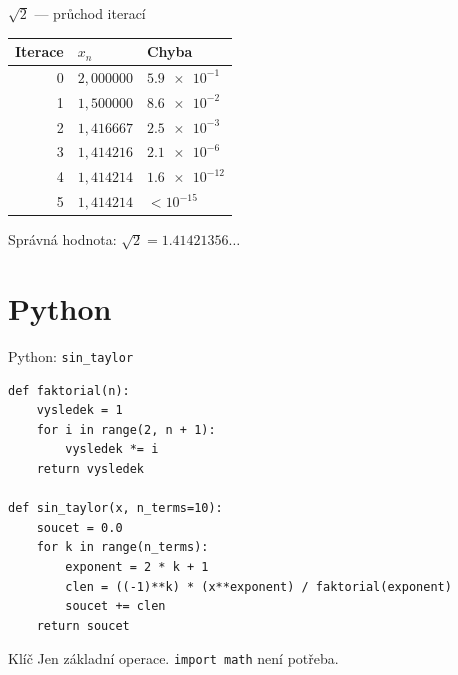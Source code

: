 \documentclass[12pt]{beamer}
\begin{document}
\begin{frame}{$\sqrt{2}$ --- průchod iterací}

    \begin{center}
    \begin{tabular}{@{}rll@{}}
    \toprule
    Iterace & $x_n$            & Chyba         \\ \midrule
    0       & $2{,}000000$     & $\num{5.9e-1}$ \\
    1       & $1{,}500000$     & $\num{8.6e-2}$ \\
    2       & $1{,}416667$     & $\num{2.5e-3}$ \\
    3       & $1{,}414216$     & $\num{2.1e-6}$ \\
    4       & $1{,}414214$     & $\num{1.6e-12}$ \\
    5       & $1{,}414214$     & $< 10^{-15}$ \\
    \bottomrule
    \end{tabular}
    \end{center}

    \medskip
    \centering
    \small Správná hodnota: $\sqrt{2} = \num{1.41421356}\ldots$

\end{frame}

\section{Python}

\begin{frame}[fragile]{Python: \texttt{sin\_taylor}}

\begin{lstlisting}
def faktorial(n):
    vysledek = 1
    for i in range(2, n + 1):
        vysledek *= i
    return vysledek

def sin_taylor(x, n_terms=10):
    soucet = 0.0
    for k in range(n_terms):
        exponent = 2 * k + 1
        clen = ((-1)**k) * (x**exponent) / faktorial(exponent)
        soucet += clen
    return soucet
\end{lstlisting}

\begin{exampleblock}{Klíč}
    Jen základní operace. \texttt{import math} není potřeba.
\end{exampleblock}

\end{frame}
\end{document}
